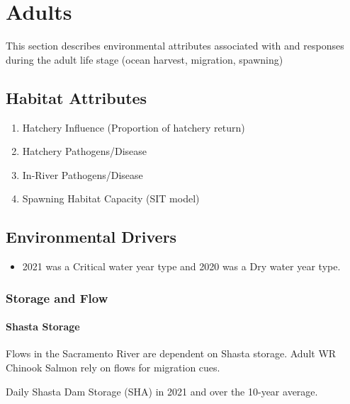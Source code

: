 \documentclass[
]{book}
\providecommand{\tightlist}{%
  \setlength{\itemsep}{0pt}\setlength{\parskip}{0pt}}
\theoremstyle{definition}
\theoremstyle{definition}
\theoremstyle{definition}
\theoremstyle{definition}
\theoremstyle{remark}
\begin{document}
\hypertarget{adults}{%
\chapter{Adults}\label{adults}}

This section describes environmental attributes associated with and responses during the adult life stage (ocean harvest, migration, spawning)

\hypertarget{habitat-attributes}{%
\section{Habitat Attributes}\label{habitat-attributes}}

\begin{enumerate}
\def\labelenumi{\arabic{enumi}.}
\item
  Hatchery Influence (Proportion of hatchery return)
\item
  Hatchery Pathogens/Disease
\item
  In-River Pathogens/Disease
\item
  Spawning Habitat Capacity (SIT model)
\end{enumerate}

\hypertarget{wq}{%
\section{Environmental Drivers}\label{wq}}

\begin{itemize}
\tightlist
\item
  2021 was a Critical water year type and 2020 was a Dry water year type.
\end{itemize}

\hypertarget{storage-and-flow}{%
\subsection{Storage and Flow}\label{storage-and-flow}}

\hypertarget{shasta-storage}{%
\subsubsection{Shasta Storage}\label{shasta-storage}}

Flows in the Sacramento River are dependent on Shasta storage. Adult WR Chinook Salmon rely on flows for migration cues.

\label{fig:SHAstor-fig}Daily Shasta Dam Storage (SHA) in 2021 and over the 10-year average.
\end{document}
